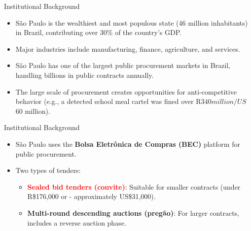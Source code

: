 \documentclass[12pt,english,xcolor=dvipsnames,aspectratio=1610]{beamer}
\begin{document}
\begin{frame}{Institutional Background}
    \begin{itemize}
            \item São Paulo is the wealthiest and most populous state (46 million inhabitants) in Brazil, contributing over 30\% of the country's GDP.\vspace{2mm}
            \item Major industries include manufacturing, finance, agriculture, and services. \vspace{2mm}\vspace{2mm}\pause
        
            \item São Paulo has one of the largest public procurement markets in Brazil, handling billions in public contracts annually. \vspace{2mm}
             \item The large scale of procurement creates opportunities for anti-competitive behavior (e.g., a detected school meal cartel was fined over R$340 million/US$60 million).\vspace{2mm}
    \end{itemize}
\end{frame}


\begin{frame}{Institutional Background}
    \begin{itemize}
        \item São Paulo uses the \textbf{Bolsa Eletrônica de Compras (BEC)} platform for public procurement.\vspace{2mm}
        \item Two types of tenders:\vspace{2mm}
        \begin{itemize}
            \item \textbf{\textcolor{red}{Sealed bid tenders (convite)}}: Suitable for smaller contracts (under R\$176,000 or - approximately US\$31,000).\vspace{2mm}
            \item \textbf{Multi-round descending auctions (pregão)}: For larger contracts, includes a reverse auction phase.\vspace{2mm}
        \end{itemize}
    \end{itemize}
\end{frame}
\end{document}
